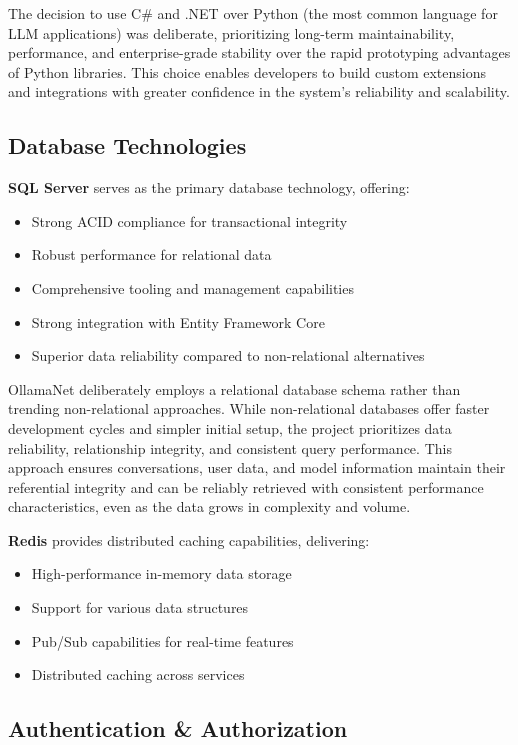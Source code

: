 The decision to use C\# and .NET over Python (the most common language for LLM applications) was deliberate, prioritizing long-term maintainability, performance, and enterprise-grade stability over the rapid prototyping advantages of Python libraries. This choice enables developers to build custom extensions and integrations with greater confidence in the system's reliability and scalability.

\subsection*{Database Technologies}

\textbf{SQL Server} serves as the primary database technology, offering:
\begin{itemize}
    \item Strong ACID compliance for transactional integrity
    \item Robust performance for relational data
    \item Comprehensive tooling and management capabilities
    \item Strong integration with Entity Framework Core
    \item Superior data reliability compared to non-relational alternatives
\end{itemize}

OllamaNet deliberately employs a relational database schema rather than trending non-relational approaches. While non-relational databases offer faster development cycles and simpler initial setup, the project prioritizes data reliability, relationship integrity, and consistent query performance. This approach ensures conversations, user data, and model information maintain their referential integrity and can be reliably retrieved with consistent performance characteristics, even as the data grows in complexity and volume.

\textbf{Redis} provides distributed caching capabilities, delivering:
\begin{itemize}
    \item High-performance in-memory data storage
    \item Support for various data structures
    \item Pub/Sub capabilities for real-time features
    \item Distributed caching across services
\end{itemize}

\subsection*{Authentication \& Authorization}

